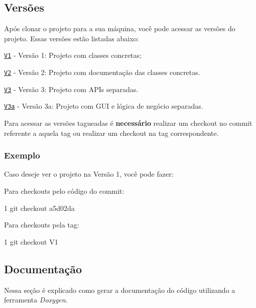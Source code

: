 \subsection*{Versões}

Após clonar o projeto para a sua máquina, você pode acessar as versões do projeto. Essas versões estão listadas abaixo\+:


\begin{DoxyItemize}
\item \href{https://bitbucket.org/KellerBreno/calculadora/commits/tag/V1}{\tt V1} -\/ Versão 1\+: Projeto com classes concretas;
\item \href{https://bitbucket.org/KellerBreno/calculadora/commits/tag/V2}{\tt V2} -\/ Versão 2\+: Projeto com documentação das classes concretas.
\item \href{https://bitbucket.org/KellerBreno/calculadora/commits/tag/V3}{\tt V3} -\/ Versão 3\+: Projeto com A\+P\+Is separadas.
\item \href{https://bitbucket.org/KellerBreno/calculadora/commits/tag/V3a}{\tt V3a} -\/ Versão 3a\+: Projeto com G\+UI e lógica de negócio separadas.
\end{DoxyItemize}

Para acessar as versões tagueadas é {\bfseries necessário} realizar um checkout no commit referente a aquela tag ou realizar um checkout na tag correspondente.

\subsubsection*{Exemplo}

Caso deseje ver o projeto na Versão 1, você pode fazer\+:

Para checkouts pelo código do commit\+:


\begin{DoxyCode}
1 git checkout a5d02da 
\end{DoxyCode}


Para checkouts pela tag\+: 
\begin{DoxyCode}
1 git checkout V1 
\end{DoxyCode}


\subsection*{Documentação}

Nessa seção é explicado como gerar a documentação do código utilizando a ferramenta {\itshape Doxygen}.

